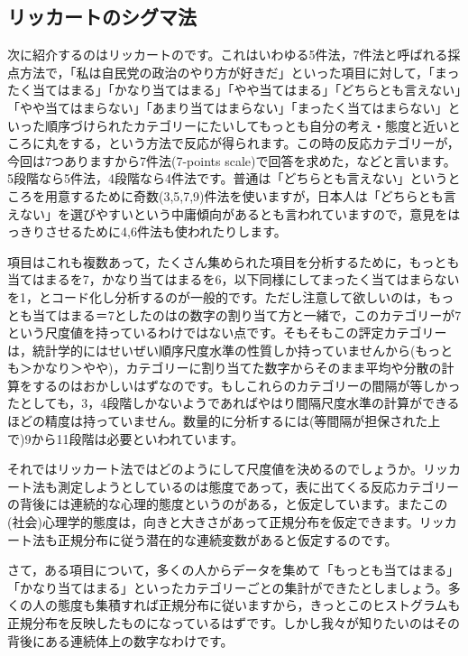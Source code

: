 \documentclass{ltjsbook}
\begin{document}
\subsection{リッカートのシグマ法}
\label{LikertScale}
次に紹介するのはリッカートのです。これはいわゆる5件法，7件法と呼ばれる採点方法で，「私は自民党の政治のやり方が好きだ」といった項目に対して，「まったく当てはまる」「かなり当てはまる」「やや当てはまる」「どちらとも言えない」「やや当てはまらない」「あまり当てはまらない」「まったく当てはまらない」といった順序づけられたカテゴリーにたいしてもっとも自分の考え・態度と近いところに丸をする，という方法で反応が得られます。この時の反応カテゴリーが，今回は7つありますから7件法(7-points scale)で回答を求めた，などと言います。5段階なら5件法，4段階なら4件法です。普通は「どちらとも言えない」というところを用意するために奇数(3,5,7,9)件法を使いますが，日本人は「どちらとも言えない」を選びやすいという中庸傾向があるとも言われていますので，意見をはっきりさせるために4,6件法も使われたりします。

項目はこれも複数あって，たくさん集められた項目を分析するために，もっとも当てはまるを7，かなり当てはまるを6，以下同様にしてまったく当てはまらないを1，とコード化し分析するのが一般的です。ただし注意して欲しいのは，もっとも当てはまる＝7としたのはの数字の割り当て方と一緒で，このカテゴリーが7という尺度値を持っているわけではない点です。そもそもこの評定カテゴリーは，統計学的にはせいぜい順序尺度水準の性質しか持っていませんから(もっとも＞かなり＞やや)，カテゴリーに割り当てた数字からそのまま平均や分散の計算をするのはおかしいはずなのです。もしこれらのカテゴリーの間隔が等しかったとしても，3，4段階しかないようであればやはり間隔尺度水準の計算ができるほどの精度は持っていません。数量的に分析するには(等間隔が担保された上で)9から11段階は必要といわれています。

それではリッカート法ではどのようにして尺度値を決めるのでしょうか。リッカート法も測定しようとしているのは態度であって，表に出てくる反応カテゴリーの背後には連続的な心理的態度というのがある，と仮定しています。またこの(社会)心理学的態度は，向きと大きさがあって正規分布を仮定できます。リッカート法も正規分布に従う潜在的な連続変数があると仮定するのです。

さて，ある項目について，多くの人からデータを集めて「もっとも当てはまる」「かなり当てはまる」といったカテゴリーごとの集計ができたとしましょう。多くの人の態度も集積すれば正規分布に従いますから，きっとこのヒストグラムも正規分布を反映したものになっているはずです。しかし我々が知りたいのはその背後にある連続体上の数字なわけです。
\end{document}
